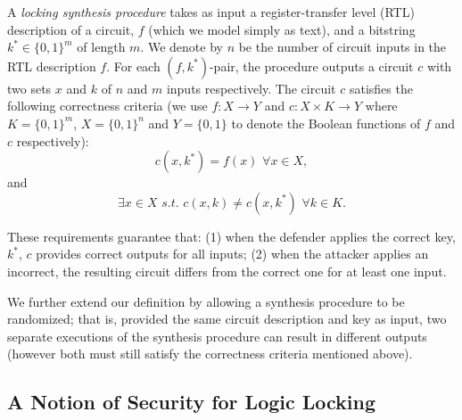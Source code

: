 \begin{definition}
A \emph{locking synthesis procedure} takes as input a register-transfer level (RTL) description of a circuit, $f$ (which we model simply as text), and a bitstring $k^{*} \in \{0,1\}^{m}$ of length $m$. We denote by $n$ be the number of circuit inputs in the RTL description $f$. For each $(f,k^*)$-pair, the procedure outputs a circuit $c$ with two sets $x$ and $k$ of $n$ and $m$ inputs respectively. The circuit $c$  satisfies the following correctness criteria (we use $f: X \rightarrow Y$ and $c: X \times K \rightarrow Y$ where $K = \{0,1\}^{m}$, $X = \{0,1\}^{n}$ and $Y = \{0,1\}$ to denote the Boolean functions of $f$ and $c$ respectively):
$$ c(x,k^{*}) = f(x) \, \, \forall x \in X, $$
and 
$$ \exists  x \in X \,\, s.t. \,\, c(x,k) \neq c(x,k^{*}) \, \, \forall k \in K.$$ 
\end{definition}



These requirements guarantee that: (1) when the defender applies the correct key, $k^{*}$,
$c$ provides correct outputs for all inputs; (2) when the attacker applies an incorrect, the resulting circuit differs from the correct one for at least one input.

We further extend our definition by allowing a synthesis procedure to be randomized; that is, provided the same circuit description and key as input, two separate executions of the synthesis procedure can result in different outputs (however both must still satisfy the correctness criteria mentioned above).

\subsection{A Notion of Security for Logic Locking}


